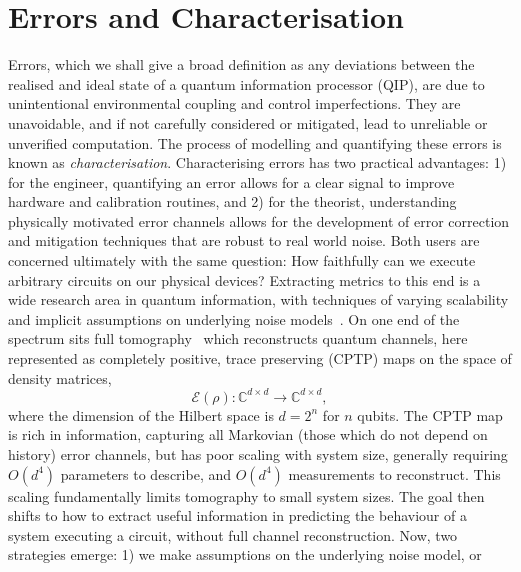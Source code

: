 \section{Errors and Characterisation}
\label{sec:k-copy_char}
Errors, which we shall give a broad definition as any deviations between the realised and ideal state of a quantum information processor (QIP), are due to unintentional environmental coupling and control imperfections. They are unavoidable, and if not carefully considered or mitigated, lead to unreliable or unverified computation. 
The process of modelling and quantifying these errors is known as \emph{characterisation}.
Characterising errors has two practical advantages: 1) for the engineer, quantifying an error allows for a clear signal to improve hardware and calibration routines, and 2) for the theorist, understanding physically motivated error channels allows for the development of error correction and mitigation techniques that are robust to real world noise. Both users are concerned ultimately with the same question: 
How faithfully can we execute arbitrary circuits on our physical devices?
Extracting metrics to this end is a wide research area in quantum information, with techniques of varying scalability and implicit assumptions on underlying noise models~\cite{eisert_quantum_2020}. On one end of the spectrum sits full
tomography~\cite{chuang_prescription_1997, nielsen_gate_2021, poyatos_complete_1997, childs_realization_2001} which reconstructs quantum channels, here represented as completely positive, trace preserving (CPTP) maps on the space of density matrices,
\begin{equation}
\mathcal{E}(\rho): \mathbb{C}^{d\times d} \to \mathbb{C}^{d\times d},
\end{equation}
where the dimension of the Hilbert space is $d=2^n$ for $n$ qubits. 
The CPTP map is rich in information, capturing all Markovian (those which do not depend on history) error channels, but has poor scaling with system size, generally requiring $O(d^4)$ parameters to describe, and $O(d^4)$ measurements to reconstruct. This scaling fundamentally limits tomography to small system sizes. 
The goal then shifts to how to extract useful information in predicting the behaviour of a system executing a circuit, without full channel reconstruction. Now, two strategies emerge: 
1) we make assumptions on the underlying noise model, or 
